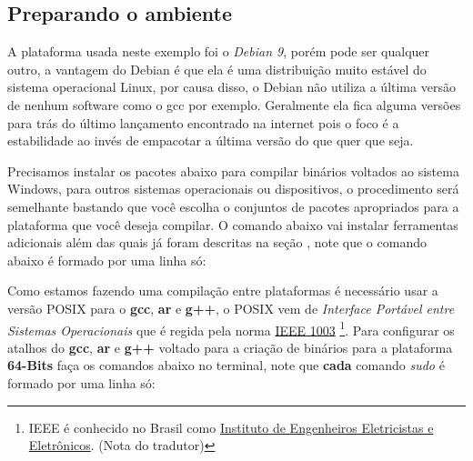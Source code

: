 \documentclass[letterpaper,10pt,brazil]{sphinxmanual}
\begin{document}
\subsection{Preparando o ambiente}
\label{initialsetup/crosscompilemame:preparando-o-ambiente}
A plataforma usada neste exemplo foi o \emph{Debian 9}, porém pode ser
qualquer outro, a vantagem do Debian é que ela é uma distribuição muito
estável do sistema operacional Linux, por causa disso, o Debian não
utiliza a última versão de nenhum software como o gcc por exemplo.
Geralmente ela fica alguma versões para trás do último lançamento
encontrado na internet pois o foco é a estabilidade ao invés de
empacotar a última versão do que quer que seja.

Precisamos instalar os pacotes abaixo para compilar binários voltados ao
sistema Windows, para outros sistemas operacionais ou dispositivos, o
procedimento será semelhante bastando que você escolha o conjuntos de
pacotes apropriados para a plataforma que você deseja compilar.
O comando abaixo vai instalar ferramentas adicionais além das quais já
foram descritas na seção {\hyperref[initialsetup/compilingmame:compiling\string-mame\string-debian]{}}, note que o
comando abaixo é formado por uma linha só:
\begin{quote}

\end{quote}

Como estamos fazendo uma compilação entre plataformas é necessário
usar a versão POSIX para o \textbf{gcc}, \textbf{ar} e \textbf{g++}, o POSIX vem de
\emph{Interface Portável entre Sistemas Operacionais} que é regida pela
norma \href{https://standards.ieee.org/standard/1003\_1-2017.html}{IEEE 1003} \footnote[3]{\sphinxAtStartFootnote%
IEEE é conhecido no Brasil como \href{https://pt.wikipedia.org/wiki/Instituto\_de\_Engenheiros\_Eletricistas\_e\_Eletrônicos}{Instituto de Engenheiros
Eletricistas e Eletrônicos}. (Nota do tradutor)
}.
Para configurar os atalhos do \textbf{gcc}, \textbf{ar} e \textbf{g++} voltado para
a criação de binários para a plataforma \textbf{64-Bits} faça os comandos
abaixo no terminal, note que \textbf{cada} comando \emph{sudo} é formado por uma
linha só:
\end{document}
